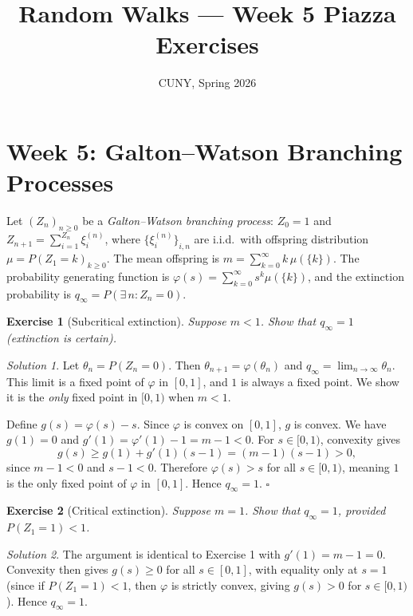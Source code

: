 \documentclass[12pt]{article}
\title{Random Walks --- Week 5 Piazza Exercises}
\author{CUNY, Spring 2026}
\date{}
\newtheorem{exercise}{Exercise}
\theoremstyle{remark}
\newtheorem*{solution}{Solution}
\begin{document}
\maketitle

\section*{Week 5: Galton--Watson Branching Processes}

Let $(Z_n)_{n \ge 0}$ be a \emph{Galton--Watson branching process}: $Z_0 = 1$ and
$Z_{n+1} = \sum_{i=1}^{Z_n} \xi_i^{(n)}$, where $\{\xi_i^{(n)}\}_{i,n}$ are i.i.d.\ with
offspring distribution $\mu = P(Z_1 = k)_{k \ge 0}$.  The mean offspring is
$m = \sum_{k=0}^\infty k\,\mu(\{k\})$.  The probability generating function is
$\varphi(s) = \sum_{k=0}^\infty s^k \mu(\{k\})$, and the extinction probability is
$q_\infty = P(\exists\, n: Z_n = 0)$.

\begin{exercise}[Subcritical extinction]
Suppose $m < 1$.  Show that $q_\infty = 1$ (extinction is certain).
\end{exercise}

\begin{solution}
Let $\theta_n = P(Z_n = 0)$.  Then $\theta_{n+1} = \varphi(\theta_n)$ and
$q_\infty = \lim_{n\to\infty} \theta_n$.  This limit is a fixed point of $\varphi$ in
$[0,1]$, and $1$ is always a fixed point.  We show it is the \emph{only} fixed point
in $[0,1)$ when $m < 1$.

Define $g(s) = \varphi(s) - s$.  Since $\varphi$ is convex on $[0,1]$, $g$ is convex.
We have $g(1) = 0$ and $g'(1) = \varphi'(1) - 1 = m - 1 < 0$.  For $s \in [0,1)$,
convexity gives
\[
  g(s) \ge g(1) + g'(1)(s - 1) = (m-1)(s-1) > 0,
\]
since $m - 1 < 0$ and $s - 1 < 0$.  Therefore $\varphi(s) > s$ for all $s \in [0,1)$,
meaning $1$ is the only fixed point of $\varphi$ in $[0,1]$.  Hence $q_\infty = 1$.
\hfill$\square$
\end{solution}

\begin{exercise}[Critical extinction]
Suppose $m = 1$.  Show that $q_\infty = 1$, provided $P(Z_1 = 1) < 1$.
\end{exercise}

\begin{solution}
The argument is identical to Exercise 1 with $g'(1) = m - 1 = 0$.  Convexity then gives
$g(s) \ge 0$ for all $s \in [0,1]$, with equality only at $s = 1$ (since if
$P(Z_1 = 1) < 1$, then $\varphi$ is strictly convex, giving $g(s) > 0$ for $s \in [0,1)$).
Hence $q_\infty = 1$.
\end{solution}
\end{document}
